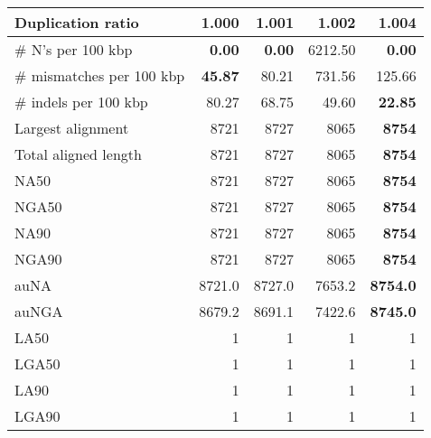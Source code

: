 \documentclass[12pt,a4paper]{article}
\begin{document}
\begin{table}[ht]
\begin{center}
\begin{tabular}{|l*{4}{|r}|}
Duplication ratio & {\bf 1.000} & 1.001 & 1.002 & 1.004 \\ \hline
\# N's per 100 kbp & {\bf 0.00} & {\bf 0.00} & 6212.50 & {\bf 0.00} \\ \hline
\# mismatches per 100 kbp & {\bf 45.87} & 80.21 & 731.56 & 125.66 \\ \hline
\# indels per 100 kbp & 80.27 & 68.75 & 49.60 & {\bf 22.85} \\ \hline
Largest alignment & 8721 & 8727 & 8065 & {\bf 8754} \\ \hline
Total aligned length & 8721 & 8727 & 8065 & {\bf 8754} \\ \hline
NA50 & 8721 & 8727 & 8065 & {\bf 8754} \\ \hline
NGA50 & 8721 & 8727 & 8065 & {\bf 8754} \\ \hline
NA90 & 8721 & 8727 & 8065 & {\bf 8754} \\ \hline
NGA90 & 8721 & 8727 & 8065 & {\bf 8754} \\ \hline
auNA & 8721.0 & 8727.0 & 7653.2 & {\bf 8754.0} \\ \hline
auNGA & 8679.2 & 8691.1 & 7422.6 & {\bf 8745.0} \\ \hline
LA50 & 1 & 1 & 1 & 1 \\ \hline
LGA50 & 1 & 1 & 1 & 1 \\ \hline
LA90 & 1 & 1 & 1 & 1 \\ \hline
LGA90 & 1 & 1 & 1 & 1 \\ \hline
\end{tabular}
\end{center}
\end{table}
\end{document}
